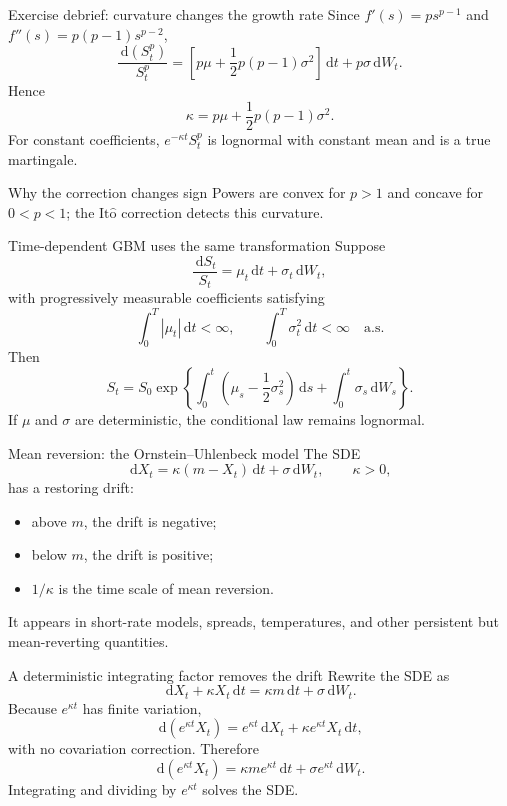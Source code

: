\documentclass[handout,10pt,aspectratio=169]{beamer}
\newcommand{\dd}{\,\mathrm d}
\newcommand{\Ito}{\mathrm{It\hat{o}}}
\begin{document}
\begin{frame}{Exercise debrief: curvature changes the growth rate}
Since \(f'(s)=ps^{p-1}\) and \(f''(s)=p(p-1)s^{p-2}\),
\[
\boxed{
\frac{\dd(S_t^p)}{S_t^p}
=\left[p\mu+\frac12p(p-1)\sigma^2\right]\dd t
+p\sigma\dd W_t.}
\]
Hence
\[
\kappa=p\mu+\frac12p(p-1)\sigma^2.
\]
For constant coefficients, \(e^{-\kappa t}S_t^p\) is lognormal with constant mean and is a true martingale.
\begin{block}{Why the correction changes sign}
Powers are convex for \(p>1\) and concave for \(0<p<1\); the \(\Ito\) correction detects this curvature.
\end{block}
\end{frame}

\begin{frame}{Time-dependent GBM uses the same transformation}
Suppose
\[
\frac{\dd S_t}{S_t}=\mu_t\dd t+\sigma_t\dd W_t,
\]
with progressively measurable coefficients satisfying
\[
\int_0^T|\mu_t|\dd t<\infty,
\qquad
\int_0^T\sigma_t^2\dd t<\infty
\quad\text{a.s.}
\]
Then
\[
\boxed{
S_t=S_0\exp\left\{
\int_0^t\left(\mu_s-\frac12\sigma_s^2\right)\dd s
+\int_0^t\sigma_s\dd W_s
\right\}.}
\]
If \(\mu\) and \(\sigma\) are deterministic, the conditional law remains lognormal.
\end{frame}

\begin{frame}{Mean reversion: the Ornstein--Uhlenbeck model}
The SDE
\[
\dd X_t=\kappa(m-X_t)\dd t+\sigma\dd W_t,
\qquad \kappa>0,
\]
has a restoring drift:
\begin{itemize}
\item above \(m\), the drift is negative;
\item below \(m\), the drift is positive;
\item \(1/\kappa\) is the time scale of mean reversion.
\end{itemize}
It appears in short-rate models, spreads, temperatures, and other persistent but mean-reverting quantities.
\end{frame}

\begin{frame}{A deterministic integrating factor removes the drift}
Rewrite the SDE as
\[
\dd X_t+\kappa X_t\dd t=\kappa m\dd t+\sigma\dd W_t.
\]
Because \(e^{\kappa t}\) has finite variation,
\[
\dd(e^{\kappa t}X_t)
=e^{\kappa t}\dd X_t+\kappa e^{\kappa t}X_t\dd t,
\]
with no covariation correction. Therefore
\[
\dd(e^{\kappa t}X_t)
=\kappa m e^{\kappa t}\dd t+\sigma e^{\kappa t}\dd W_t.
\]
Integrating and dividing by \(e^{\kappa t}\) solves the SDE.
\end{frame}
\end{document}
